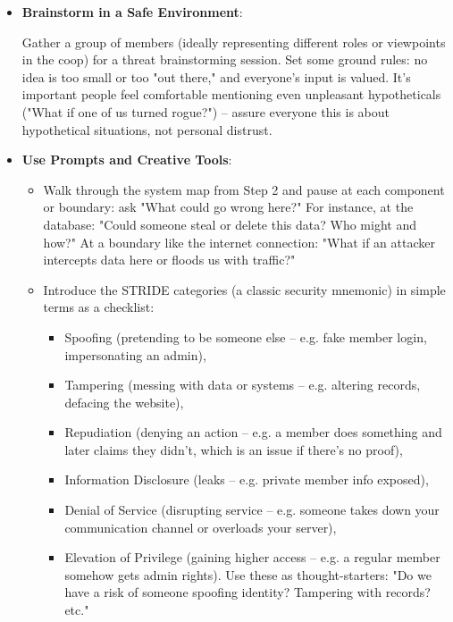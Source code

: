 \begin{itemize}

    \item \textbf{Brainstorm in a Safe Environment}:
    
    Gather a group of members (ideally representing different roles or viewpoints in
    the coop) for a threat brainstorming session. Set some ground rules: no idea is
    too small or too "out there," and everyone's input is valued. It's important
    people feel comfortable mentioning even unpleasant hypotheticals ("What if one
    of us turned rogue?") – assure everyone this is about hypothetical situations,
    not personal distrust.

    \item \textbf{Use Prompts and Creative Tools}:
    \begin{itemize}
        \item Walk through the system map from Step 2 and pause at each component or boundary:
        ask "What could go wrong here?" For instance, at the database: "Could someone
        steal or delete this data? Who might and how?" At a boundary like the internet
        connection: "What if an attacker intercepts data here or floods us with
        traffic?"

        \item Introduce the STRIDE categories (a classic security mnemonic) in simple
        terms as a checklist:

        \begin{itemize}
            \item	Spoofing (pretending to be someone else – e.g. fake member login, impersonating an admin),
            \item	Tampering (messing with data or systems – e.g. altering records, defacing the website),
            \item	Repudiation (denying an action – e.g. a member does something and later claims they didn't,
            which is an issue if there's no proof),
            \item	Information Disclosure (leaks – e.g. private member info exposed),
            \item	Denial of Service (disrupting service – e.g. someone takes down your communication channel
            or overloads your server),
            \item	Elevation of Privilege (gaining higher access – e.g. a regular member somehow gets admin
            rights). Use these as thought-starters: "Do we have a risk of someone spoofing identity? Tampering
            with records? etc."
        \end{itemize}    


\end{itemize}
\end{itemize}
